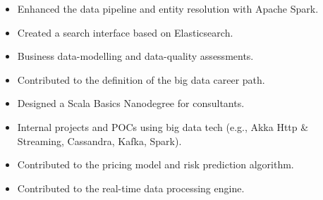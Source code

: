 \documentclass[10pt,a4paper]{altacv}
\begin{document}


\begin{fullwidth}
\makecvheader
\end{fullwidth}






\begin{itemize}
    \item Enhanced the data pipeline and entity resolution with Apache Spark.
    \item Created a search interface based on Elasticsearch.
    \item Business data-modelling and data-quality assessments. 
\end{itemize}


\begin{itemize}
    \item Contributed to the definition of the big data career path.  
    \item Designed a Scala Basics Nanodegree for consultants. 
    \item Internal projects and POCs using big data tech (e.g., Akka Http \& Streaming, Cassandra, Kafka, Spark).
\end{itemize}

\begin{itemize}
    \item Contributed to the pricing model and risk prediction algorithm.
    \item Contributed to the real-time data processing engine.
\end{itemize}
\end{document}
